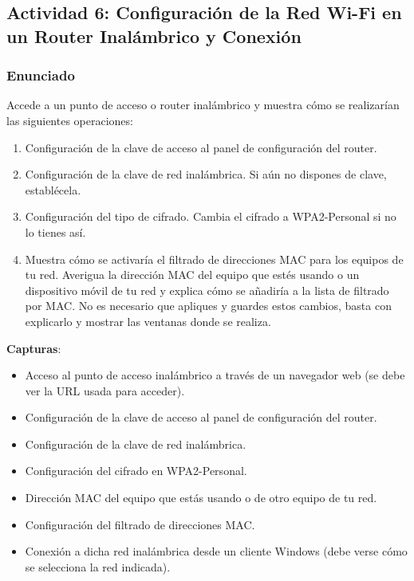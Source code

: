 \subsection{Actividad 6: Configuración de la Red Wi-Fi en un Router Inalámbrico y Conexión}

\subsubsection{Enunciado}
Accede a un punto de acceso o router inalámbrico y muestra cómo se realizarían las siguientes operaciones:

\begin{enumerate}
    \item Configuración de la clave de acceso al panel de configuración del router.
    \item Configuración de la clave de red inalámbrica. Si aún no dispones de clave, establécela.
    \item Configuración del tipo de cifrado. Cambia el cifrado a WPA2-Personal si no lo tienes así.
    \item Muestra cómo se activaría el filtrado de direcciones MAC para los equipos de tu red. Averigua la dirección MAC del equipo que estés usando o un dispositivo móvil de tu red y explica cómo se añadiría a la lista de filtrado por MAC. No es necesario que apliques y guardes estos cambios, basta con explicarlo y mostrar las ventanas donde se realiza.
\end{enumerate}

\textbf{Capturas}:

\begin{itemize}
    \item Acceso al punto de acceso inalámbrico a través de un navegador web (se debe ver la URL usada para acceder).
    \item Configuración de la clave de acceso al panel de configuración del router.
    \item Configuración de la clave de red inalámbrica.
    \item Configuración del cifrado en WPA2-Personal.
    \item Dirección MAC del equipo que estás usando o de otro equipo de tu red.
    \item Configuración del filtrado de direcciones MAC.
    \item Conexión a dicha red inalámbrica desde un cliente Windows (debe verse cómo se selecciona la red indicada).
\end{itemize}


